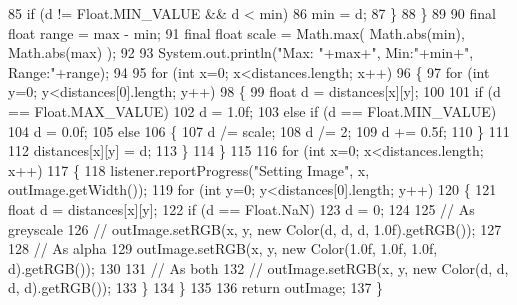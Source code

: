 \begin{DoxyCode}
85                 \textcolor{keywordflow}{if} (d != Float.MIN\_VALUE && d < min)
86                     min = d;
87             \}
88         \}
89         
90         \textcolor{keyword}{final} \textcolor{keywordtype}{float} range = max - min;
91         \textcolor{keyword}{final} \textcolor{keywordtype}{float} scale = Math.max( Math.abs(min), Math.abs(max) );
92         
93         System.out.println(\textcolor{stringliteral}{"Max: "}+max+\textcolor{stringliteral}{", Min:"}+min+\textcolor{stringliteral}{", Range:"}+range);
94         
95         \textcolor{keywordflow}{for} (\textcolor{keywordtype}{int} x=0; x<distances.length; x++)
96         \{
97             \textcolor{keywordflow}{for} (\textcolor{keywordtype}{int} y=0; y<distances[0].length; y++)
98             \{
99                 \textcolor{keywordtype}{float} d = distances[x][y];
100                 
101                 \textcolor{keywordflow}{if} (d == Float.MAX\_VALUE)
102                     d = 1.0f;
103                 \textcolor{keywordflow}{else} \textcolor{keywordflow}{if} (d == Float.MIN\_VALUE)
104                     d = 0.0f;
105                 \textcolor{keywordflow}{else}
106                 \{
107                     d /= scale;
108                     d /= 2;
109                     d += 0.5f;
110                 \}
111                 
112                 distances[x][y] = d;
113             \}
114         \}
115 
116         \textcolor{keywordflow}{for} (\textcolor{keywordtype}{int} x=0; x<distances.length; x++)
117         \{
118             listener.reportProgress(\textcolor{stringliteral}{"Setting Image"}, x, outImage.getWidth());
119             \textcolor{keywordflow}{for} (\textcolor{keywordtype}{int} y=0; y<distances[0].length; y++)
120             \{
121                 \textcolor{keywordtype}{float} d = distances[x][y];
122                 \textcolor{keywordflow}{if} (d == Float.NaN)
123                     d = 0;
124                 
125                 \textcolor{comment}{// As greyscale}
126             \textcolor{comment}{//  outImage.setRGB(x, y, new Color(d, d, d, 1.0f).getRGB());}
127                 
128                 \textcolor{comment}{// As alpha}
129                 outImage.setRGB(x, y, \textcolor{keyword}{new} Color(1.0f, 1.0f, 1.0f, d).getRGB());
130                 
131                 \textcolor{comment}{// As both}
132             \textcolor{comment}{//  outImage.setRGB(x, y, new Color(d, d, d, d).getRGB());}
133             \}
134         \}
135         
136         \textcolor{keywordflow}{return} outImage;
137     \}
\end{DoxyCode}
\mbox{\label{classorg_1_1newdawn_1_1slick_1_1tools_1_1hiero_1_1distancemap_1_1_distance_field_filter_aa00f09a7d2e13879b1434ed53aea0eef}} 
